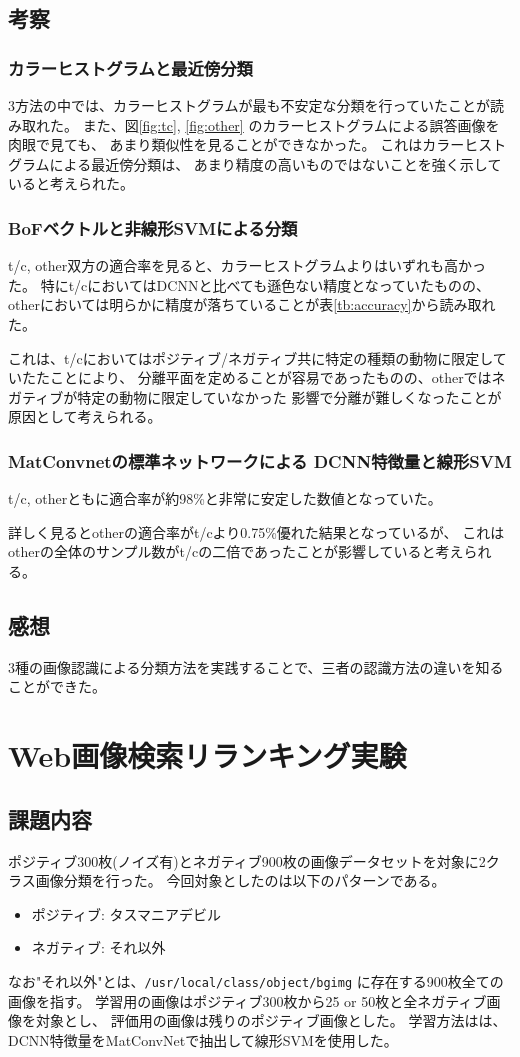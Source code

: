 \documentclass[11pt,a4paper, uplatex]{jsreport}
\begin{document}
\section{考察}
\subsection{カラーヒストグラムと最近傍分類}
3方法の中では、カラーヒストグラムが最も不安定な分類を行っていたことが読み取れた。
また、図\ref{fig:tc}, \ref{fig:other}
のカラーヒストグラムによる誤答画像を肉眼で見ても、
あまり類似性を見ることができなかった。
これはカラーヒストグラムによる最近傍分類は、
あまり精度の高いものではないことを強く示していると考えられた。

\subsection{BoFベクトルと非線形SVMによる分類}
t/c, other双方の適合率を見ると、カラーヒストグラムよりはいずれも高かった。
特にt/cにおいてはDCNNと比べても遜色ない精度となっていたものの、
otherにおいては明らかに精度が落ちていることが表\ref{tb:accuracy}から読み取れた。

これは、t/cにおいてはポジティブ/ネガティブ共に特定の種類の動物に限定していたたことにより、
分離平面を定めることが容易であったものの、otherではネガティブが特定の動物に限定していなかった
影響で分離が難しくなったことが原因として考えられる。

\subsection{MatConvnetの標準ネットワークによる DCNN特徴量と線形SVM}
t/c, otherともに適合率が約98\%と非常に安定した数値となっていた。

詳しく見るとotherの適合率がt/cより0.75\%優れた結果となっているが、
これはotherの全体のサンプル数がt/cの二倍であったことが影響していると考えられる。
\section{感想}
3種の画像認識による分類方法を実践することで、三者の認識方法の違いを知ることができた。
\chapter{Web画像検索リランキング実験}
\section{課題内容}
ポジティブ300枚(ノイズ有)とネガティブ900枚の画像データセットを対象に2クラス画像分類を行った。
今回対象としたのは以下のパターンである。
\begin{itemize}
  \item ポジティブ: タスマニアデビル
  \item ネガティブ: それ以外
\end{itemize}
なお"それ以外"とは、\texttt{/usr/local/class/object/bgimg}
に存在する900枚全ての画像を指す。
学習用の画像はポジティブ300枚から25 or 50枚と全ネガティブ画像を対象とし、
評価用の画像は残りのポジティブ画像とした。
学習方法はは、DCNN特徴量をMatConvNetで抽出して線形SVMを使用した。
\end{document}
